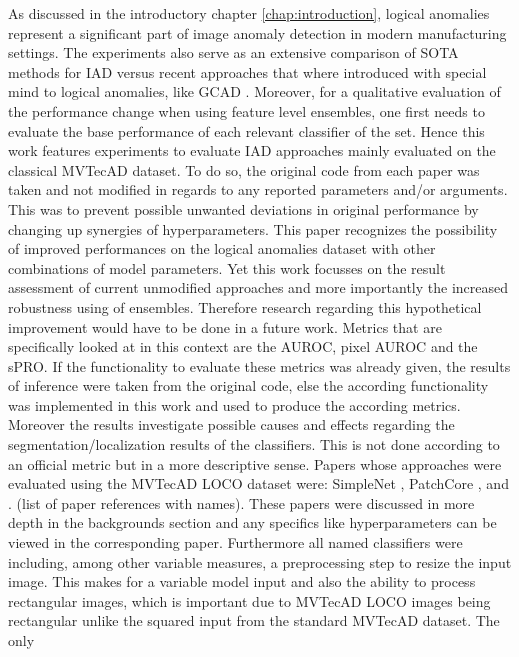 As discussed in the introductory chapter \ref{chap:introduction}, logical anomalies represent a significant part of image anomaly detection in modern
manufacturing settings. The experiments also serve as an extensive comparison of SOTA methods for IAD versus recent approaches that where 
introduced with special mind to logical anomalies, like GCAD \cite{LOCODentsAndScratchesBergmann2022}. 
Moreover, for a qualitative evaluation of the performance change when using feature level ensembles, one first needs to evaluate the base performance 
of each relevant classifier of the set. 
Hence this work features experiments to evaluate IAD approaches mainly evaluated on the classical MVTecAD dataset. To do so, the original 
code from each paper was taken and not modified in regards to any reported parameters and/or arguments. This was to prevent possible unwanted deviations 
in original performance by changing up synergies of hyperparameters. This paper recognizes the possibility of improved performances on the logical anomalies dataset 
with other combinations of model parameters. Yet this work focusses on the result assessment of current unmodified approaches and 
more importantly the increased robustness using of ensembles. Therefore research regarding this hypothetical improvement would 
have to be done in a future work. Metrics that are specifically looked at in this context are the AUROC, pixel AUROC and the sPRO. 
If the functionality to evaluate these metrics was already given, the results of inference were taken from the original code, else the according functionality 
was implemented in this work and used to produce the according metrics. Moreover the results investigate possible causes and effects regarding the segmentation/localization results of the 
classifiers. This is not done according to an official metric but in a more descriptive sense.
Papers whose approaches were evaluated using the MVTecAD LOCO dataset were: SimpleNet \cite{liu2023simplenet}, PatchCore \cite{patchCore2022}, \cite{csflow2022} and \cite{Zavrtanik_2021DRAEM}. (list of paper references with names). 
These papers were discussed in more depth in the backgrounds section and any specifics like 
hyperparameters can be viewed in the corresponding paper. Furthermore all named classifiers were including, among other variable measures, 
a preprocessing step to resize the input image. This makes for a variable model input and also the ability to process rectangular images, 
which is important due to MVTecAD LOCO images being rectangular unlike the squared input from the standard MVTecAD dataset. The only 

